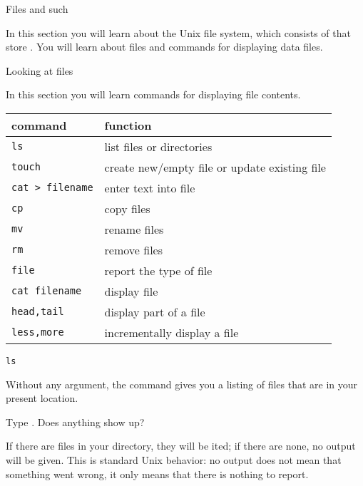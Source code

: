  {Files and such}

\begin{purpose}
In this section you will learn about the Unix file system, which
consists of  that store . You
will learn about  files and commands for
displaying data files.
\end{purpose}

 {Looking at files}

\begin{purpose}
In this section you will learn commands for displaying file contents.
\end{purpose}

\begin{tabular}{ll}
  \toprule
  command&function\\
  \midrule
  \texttt{ls} & list files or directories\\
  \texttt{touch} & create new/empty file or update existing file\\
  \verb+cat > filename+ & enter text into file\\
  \texttt{cp} & copy files\\
  \texttt{mv} & rename files\\
  \texttt{rm} & remove files\\
  \texttt{file} & report the type of file\\
  \texttt{cat filename} & display file\\
  \texttt{head,tail} & display part of a file\\
  \texttt{less,more} & incrementally display a file\\
  \bottomrule
\end{tabular}

 {\texttt{ls}}

Without any argument, the  command gives you a
listing of files that are in your present location.

\begin{exercise}
  Type . Does anything show up?
\end{exercise}
\begin{outcome}
  If there are files in your directory, they will be ited;
  if there are none, no output will be given. This is standard Unix
  behavior: no output does not mean that something went wrong, it
  only means that there is nothing to report.
\end{outcome}

